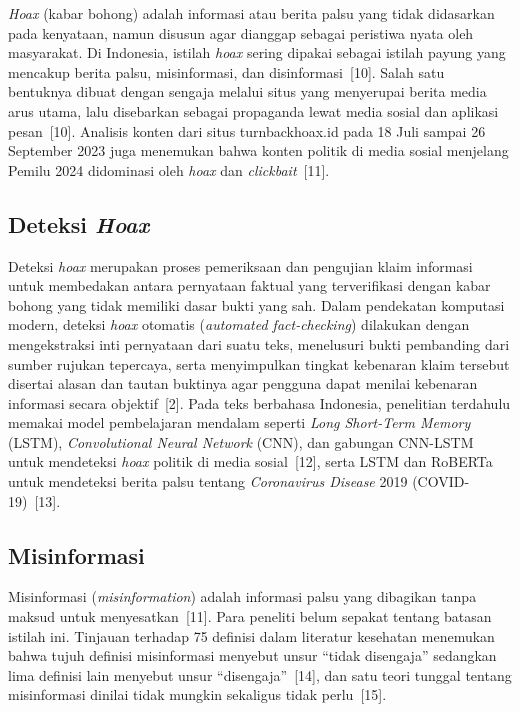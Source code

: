 \documentclass[12pt,a4paper,twoside]{report}
\begin{document}
\textit{Hoax} (kabar bohong) adalah informasi atau berita palsu yang tidak didasarkan pada kenyataan, namun disusun agar dianggap sebagai peristiwa nyata oleh masyarakat. Di Indonesia, istilah \textit{hoax} sering dipakai sebagai istilah payung yang mencakup berita palsu, misinformasi, dan disinformasi~[10]. Salah satu bentuknya dibuat dengan sengaja melalui situs yang menyerupai berita media arus utama, lalu disebarkan sebagai propaganda lewat media sosial dan aplikasi pesan~[10]. Analisis konten dari situs turnbackhoax.id pada 18 Juli sampai 26 September 2023 juga menemukan bahwa konten politik di media sosial menjelang Pemilu 2024 didominasi oleh \textit{hoax} dan \textit{clickbait}~[11].

\subsection{Deteksi \textit{Hoax}}

Deteksi \textit{hoax} merupakan proses pemeriksaan dan pengujian klaim informasi untuk membedakan antara pernyataan faktual yang terverifikasi dengan kabar bohong yang tidak memiliki dasar bukti yang sah. Dalam pendekatan komputasi modern, deteksi \textit{hoax} otomatis (\textit{automated fact-checking}) dilakukan dengan mengekstraksi inti pernyataan dari suatu teks, menelusuri bukti pembanding dari sumber rujukan tepercaya, serta menyimpulkan tingkat kebenaran klaim tersebut disertai alasan dan tautan buktinya agar pengguna dapat menilai kebenaran informasi secara objektif~[2]. Pada teks berbahasa Indonesia, penelitian terdahulu memakai model pembelajaran mendalam seperti \textit{Long Short-Term Memory} (LSTM), \textit{Convolutional Neural Network} (CNN), dan gabungan CNN-LSTM untuk mendeteksi \textit{hoax} politik di media sosial~[12], serta LSTM dan RoBERTa untuk mendeteksi berita palsu tentang \textit{Coronavirus Disease} 2019 (COVID-19)~[13].

\subsection{Misinformasi}

Misinformasi (\textit{misinformation}) adalah informasi palsu yang dibagikan tanpa maksud untuk menyesatkan~[11]. Para peneliti belum sepakat tentang batasan istilah ini. Tinjauan terhadap 75 definisi dalam literatur kesehatan menemukan bahwa tujuh definisi misinformasi menyebut unsur ``tidak disengaja'' sedangkan lima definisi lain menyebut unsur ``disengaja''~[14], dan satu teori tunggal tentang misinformasi dinilai tidak mungkin sekaligus tidak perlu~[15].
\end{document}
